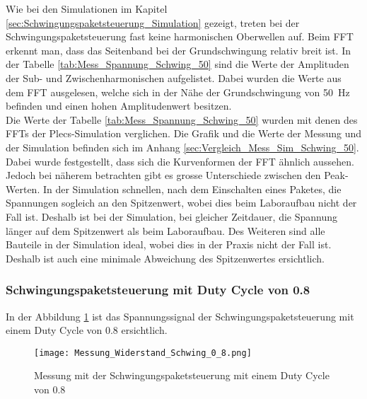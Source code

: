 Wie bei den Simulationen im Kapitel \ref{sec:Schwingungspaketsteuerung_Simulation} gezeigt, treten bei der Schwingungspaketsteuerung fast keine harmonischen Oberwellen auf. Beim FFT erkennt man, dass das Seitenband bei der Grundschwingung relativ breit ist. In der Tabelle \ref{tab:Mess_Spannung_Schwing_50} sind die Werte der Amplituden der Sub- und Zwischenharmonischen aufgelistet. Dabei wurden die Werte aus dem FFT ausgelesen, welche sich in der Nähe der Grundschwingung von \SI{50}{Hz} befinden und einen hohen Amplitudenwert besitzen. \\
Die Werte der Tabelle \ref{tab:Mess_Spannung_Schwing_50} wurden mit denen des FFTs der Plecs-Simulation verglichen. Die Grafik und die Werte der Messung und der Simulation befinden sich im Anhang \ref{sec:Vergleich_Mess_Sim_Schwing_50}. Dabei wurde festgestellt, dass sich die Kurvenformen der FFT ähnlich aussehen. Jedoch bei näherem betrachten gibt es grosse Unterschiede zwischen den Peak-Werten. In der Simulation schnellen, nach dem Einschalten eines Paketes, die Spannungen sogleich an den Spitzenwert, wobei dies beim Laboraufbau nicht der Fall ist. Deshalb ist bei der Simulation, bei gleicher Zeitdauer, die Spannung länger auf dem Spitzenwert als beim Laboraufbau. Des Weiteren sind alle Bauteile in der Simulation ideal, wobei dies in der Praxis nicht der Fall ist. Deshalb ist auch eine minimale Abweichung des Spitzenwertes ersichtlich.



\newpage
\subsubsection*{Schwingungspaketsteuerung mit Duty Cycle von 0.8}
In der Abbildung \ref{fig:Mess_Schwing_80} ist das Spannungssignal der Schwingungspaketsteuerung mit einem Duty Cycle von 0.8 ersichtlich.
\begin{figure}[ht!]
	\centering
	\texttt{[image: Messung\_Widerstand\_Schwing\_0\_8.png]}	
	\caption{Messung mit der Schwingungspaketsteuerung mit einem Duty Cycle von 0.8}\label{fig:Mess_Schwing_80}
\end{figure}


